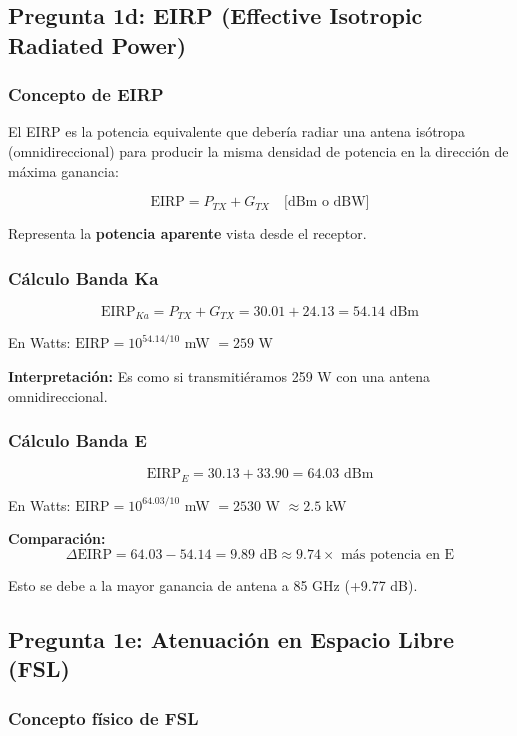 \documentclass[a4paper,10pt]{article}
\begin{document}
\subsection{Pregunta 1d: EIRP (Effective Isotropic Radiated Power)}

\subsubsection{Concepto de EIRP}

El EIRP es la potencia equivalente que debería radiar una antena isótropa (omnidireccional) para producir la misma densidad de potencia en la dirección de máxima ganancia:

$$\text{EIRP} = P_{TX} + G_{TX} \quad \text{[dBm o dBW]}$$

Representa la \textbf{potencia aparente} vista desde el receptor.

\subsubsection{Cálculo Banda Ka}

$$\text{EIRP}_{Ka} = P_{TX} + G_{TX} = 30.01 + 24.13 = \boxed{54.14 \text{ dBm}}$$

En Watts: $\text{EIRP} = 10^{54.14/10}$ mW $= 259$ W

\textbf{Interpretación:} Es como si transmitiéramos 259 W con una antena omnidireccional.

\subsubsection{Cálculo Banda E}

$$\text{EIRP}_E = 30.13 + 33.90 = \boxed{64.03 \text{ dBm}}$$

En Watts: $\text{EIRP} = 10^{64.03/10}$ mW $= 2530$ W $\approx 2.5$ kW

\textbf{Comparación:}
$$\Delta \text{EIRP} = 64.03 - 54.14 = 9.89 \text{ dB} \approx 9.74 \times \text{ más potencia en E}$$

Esto se debe a la mayor ganancia de antena a 85 GHz (+9.77 dB).

\subsection{Pregunta 1e: Atenuación en Espacio Libre (FSL)}

\subsubsection{Concepto físico de FSL}
\end{document}
